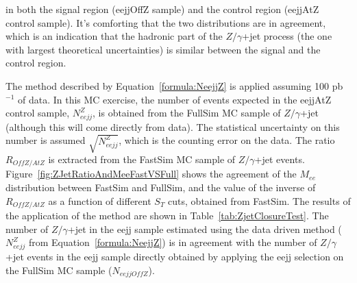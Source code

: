 \begin{itemize}
in both the signal region (eejjOffZ sample) and the control region (eejjAtZ control sample). 
It's comforting that the two distributions are in agreement, 
which is an indication that the hadronic part of the $Z/\gamma$+jet process 
(the one with largest theoretical uncertainties) is similar between 
the signal and the control region.  
%
\end{itemize}

The method described by Equation~\ref{formula:NeejjZ} is applied assuming 100 pb$^{-1}$ 
of data. In this MC exercise, the number of events expected in the eejjAtZ control sample, $N_{eejj}^{Z}$, 
is obtained from the FullSim MC sample of $Z/\gamma$+jet (although this will come directly from data).
The statistical uncertainty on this number is assumed $\sqrt{N_{eejj}^{Z}}$, which is 
the counting error on the data.
The ratio $R_{OffZ/AtZ}$ is extracted from the FastSim MC sample of $Z/\gamma$+jet events.
Figure~\ref{fig:ZJetRatioAndMeeFastVSFull} shows the agreement of the 
$M_{ee}$ distribution between FastSim and FullSim, and the value of the inverse of $R_{OffZ/AtZ}$ 
as a function of different $S_{T}$ cuts, obtained from FastSim. 
The results of the application of the method are shown in Table~\ref{tab:ZjetClosureTest}.
The number of $Z/\gamma$+jet in the eejj sample estimated using the data driven method 
($N_{eejj}^{Z}$ from Equation~\ref{formula:NeejjZ}) 
is in agreement with the number of $Z/\gamma$+jet events in the eejj sample directly 
obtained by applying the eejj selection on the FullSim MC sample ($N_{eejjOffZ}$).


